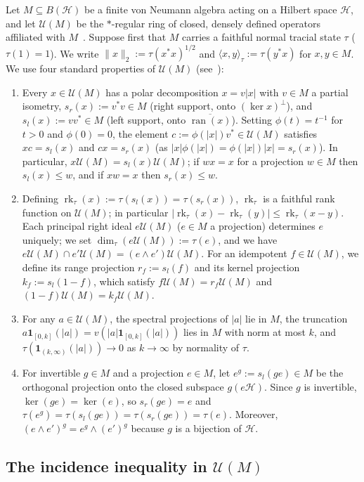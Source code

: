 \documentclass[11pt]{article}
\theoremstyle{definition}
\theoremstyle{remark}
\numberwithin{equation}{section}
\DeclareMathOperator{\rk}{rk}
\DeclareMathOperator{\ran}{ran}
\newcommand{\U}{\mathcal{U}}
\newcommand{\HH}{\mathcal{H}}
\newcommand{\1}{\mathbf{1}}
\begin{document}
Let $M \subseteq B(\HH)$ be a finite von Neumann algebra acting on a Hilbert space $\HH$, and let $\U(M)$ be the $*$-regular ring of closed, densely defined operators affiliated with $M$~\cite{MurrayVonNeumann,Berberian1957,Luck2002}. Suppose first that $M$ carries a faithful normal tracial state $\tau$ ($\tau(1) = 1$). We write $\|x\|_2 := \tau(x^*x)^{1/2}$ and $\langle x, y \rangle_\tau := \tau(y^* x)$ for $x, y \in M$. We use four standard properties of $\U(M)$ (see~\cite[Chapter~8]{Luck2002}):
\begin{enumerate}[label=(U\arabic*),leftmargin=2.8em]
\item Every $x \in \U(M)$ has a polar decomposition $x = v|x|$ with $v \in M$ a partial isometry, $s_r(x) := v^*v \in M$ (right support, onto $(\ker x)^\perp$), and $s_l(x) := vv^* \in M$ (left support, onto $\overline{\ran(x)}$). Setting $\phi(t) = t^{-1}$ for $t > 0$ and $\phi(0) = 0$, the element $c := \phi(|x|) v^* \in \U(M)$ satisfies $xc = s_l(x)$ and $cx = s_r(x)$ (as $|x|\phi(|x|) = \phi(|x|)|x| = s_r(x)$). In particular, $x\U(M) = s_l(x)\U(M)$; if $wx = x$ for a projection $w \in M$ then $s_l(x) \le w$, and if $xw = x$ then $s_r(x) \le w$.
\item Defining $\rk_\tau(x) := \tau(s_l(x)) = \tau(s_r(x))$, $\rk_\tau$ is a faithful rank function on $\U(M)$; in particular $|\rk_\tau(x) - \rk_\tau(y)| \le \rk_\tau(x - y)$. Each principal right ideal $e\U(M)$ ($e \in M$ a projection) determines $e$ uniquely; we set $\dim_\tau(e\U(M)) := \tau(e)$, and we have $e\U(M) \cap e'\U(M) = (e \wedge e')\U(M)$. For an idempotent $f \in \U(M)$, we define its range projection $r_f := s_l(f)$ and its kernel projection $k_f := s_l(1 - f)$, which satisfy $f\U(M) = r_f\U(M)$ and $(1 - f)\U(M) = k_f\U(M)$.
\item For any $a \in \U(M)$, the spectral projections of $|a|$ lie in $M$, the truncation $a\1_{[0,k]}(|a|) = v(|a|\1_{[0,k]}(|a|))$ lies in $M$ with norm at most $k$, and $\tau(\1_{(k,\infty)}(|a|)) \to 0$ as $k \to \infty$ by normality of $\tau$.
\item For invertible $g \in M$ and a projection $e \in M$, let $e^g := s_l(ge) \in M$ be the orthogonal projection onto the closed subspace $g(e\HH)$. Since $g$ is invertible, $\ker(ge) = \ker(e)$, so $s_r(ge) = e$ and $\tau(e^g) = \tau(s_l(ge)) = \tau(s_r(ge)) = \tau(e)$. Moreover, $(e \wedge e')^g = e^g \wedge (e')^g$ because $g$ is a bijection of $\HH$.
\end{enumerate}

\subsection{The incidence inequality in \texorpdfstring{$\U(M)$}{U(M)}}
\end{document}
